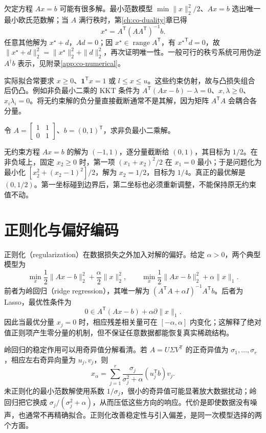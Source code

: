 欠定方程 $Ax=b$ 可能有很多解。最小范数模型 $\min\|x\|_2^2/2$、$Ax=b$ 选出唯一最小欧氏范数解；当 $A$ 满行秩时，第\ref{ch:co-duality}章已得
\[
 x^\star=A^{\mathsf T}(AA^{\mathsf T})^{-1}b.
\]
任意其他解为 $x^\star+d$，$Ad=0$；因 $x^\star\in\operatorname{range}A^{\mathsf T}$，有 ${x^\star}^{\mathsf T}d=0$，故 $\|x^\star+d\|_2^2=\|x^\star\|_2^2+\|d\|_2^2$，再次证明唯一性。一般可行的秩亏系统可用伪逆 $A^\dagger b$ 表示，见附录\ref{app:co-numerical}。

实际拟合常要求 $x\geq0$、$\mathbf1^{\mathsf T}x=1$ 或 $l\leq x\leq u$。这些约束仿射，故与凸损失组合后仍凸。例如非负最小二乘的 KKT 条件为 $A^{\mathsf T}(Ax-b)-\lambda=0$、$x,\lambda\geq0$、$x_i\lambda_i=0$。将无约束解的负分量直接截断通常不是其解，因为矩阵 $A^{\mathsf T}A$ 会耦合各分量。

\begin{example}[为什么不能总是先拟合再截断]
令 $A=\left[\begin{smallmatrix}1&1\\0&1\end{smallmatrix}\right]$、$b=(0,1)^{\mathsf T}$，求非负最小二乘解。
\end{example}
\begin{solve}
无约束方程 $Ax=b$ 的解为 $(-1,1)$，逐分量截断给 $(0,1)$，其目标为 $1/2$。在非负域上，固定 $x_2\geq0$ 时，第一项 $(x_1+x_2)^2/2$ 在 $x_1=0$ 最小；于是问题化为最小化 $[x_2^2+(x_2-1)^2]/2$，解为 $x_2=1/2$，目标为 $1/4$。真正的最优解是 $(0,1/2)$。第一坐标碰到边界后，第二坐标也必须重新调整，不能保持原无约束值不动。
\end{solve}

\section{正则化与偏好编码}

正则化（regularization）在数据损失之外加入对解的偏好。给定 $\alpha>0$，两个典型模型为
\begin{equation}
 \min_x\frac12\|Ax-b\|_2^2+\frac\alpha2\|x\|_2^2,
 \qquad
 \min_x\frac12\|Ax-b\|_2^2+\alpha\|x\|_1.
 \label{eq:co-regularized-fitting}
\end{equation}
前者为岭回归（ridge regression），其唯一解为 $(A^{\mathsf T}A+\alpha I)^{-1}A^{\mathsf T}b$。后者为 Lasso，最优性条件为
\[
 0\in A^{\mathsf T}(Ax-b)+\alpha\partial\|x\|_1.
\]
因此当最优分量 $x_j=0$ 时，相应残差相关量可在 $[-\alpha,\alpha]$ 内变化；这解释了绝对值正则项产生零分量的机制，但不保证任意数据都能恢复真实稀疏结构。

岭回归的稳定作用可以用奇异值分解看清。若 $A=U\Sigma V^{\mathsf T}$ 的正奇异值为 $\sigma_1,\ldots,\sigma_r$，相应左右奇异向量为 $u_j,v_j$，则
\[
 x_\alpha=\sum_{j=1}^r
 \frac{\sigma_j}{\sigma_j^2+\alpha}(u_j^{\mathsf T}b)v_j.
\]
未正则化的最小范数解使用系数 $1/\sigma_j$，很小的奇异值可能显著放大数据扰动；岭回归把它换成 $\sigma_j/(\sigma_j^2+\alpha)$，从而压低这些方向的响应。代价是即使数据没有噪声，也通常不再精确拟合。正则化改善稳定性与引入偏差，是同一次模型选择的两个方面。

